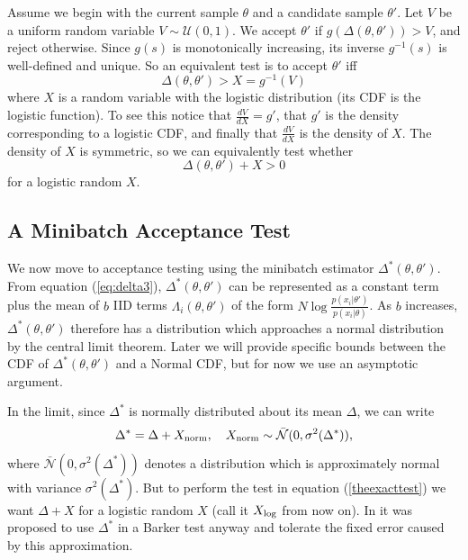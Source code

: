 \documentclass{article}
\begin{document}
Assume we begin with the current sample $\theta$  and a
candidate sample $\theta'$. Let $V$ be a uniform random variable $V \sim
\mathcal{U}(0,1)$. We accept $\theta'$ if $g(\Delta(\theta,\theta')) > V$, and reject otherwise.
Since $g(s)$ is monotonically increasing, its inverse $g^{-1}(s)$ is well-defined and
unique. So an equivalent test is to accept $\theta'$ iff
\begin{equation}
  \Delta(\theta,\theta') > X = g^{-1}(V)
\end{equation}
where $X$ is a random variable with the logistic distribution (its CDF is the logistic function). To
see this notice that $\frac{dV}{dX} = g'$, that $g'$ is the density corresponding to a logistic
CDF, and finally that $\frac{dV}{dX}$ is the density of $X$. The density of $X$ is symmetric,
so we can equivalently test whether
\begin{equation}
  \label{theexacttest}
  \Delta(\theta,\theta') + X > 0
\end{equation}
for a logistic random $X$. 


\subsection{A Minibatch Acceptance Test}\label{ssec:deltas_minibatch}

We now move to acceptance testing using the minibatch estimator
$\Delta^*(\theta,\theta')$. From equation (\ref{eq:delta3}),
$\Delta^*(\theta,\theta')$ can be represented as a constant term
plus the mean of $b$ IID terms $\Lambda_i(\theta,\theta')$ of the form
$N\log\frac{p(x_i|\theta')}{p(x_i|\theta)}$. As $b$ increases, $\Delta^*(\theta,\theta')$
therefore has a distribution which approaches a normal distribution by the central limit
theorem. Later we will provide specific bounds between the CDF of $\Delta^*(\theta,\theta')$
and a Normal CDF, but for now we use an asymptotic argument. 

In the limit, since $\Delta^*$ is normally distributed about its mean $\Delta$, we
can write
\begin{equation}\label{eq:relationship}
\Delta^* = \Delta + X_{\rm norm}, \quad X_{\rm norm} \sim \mathcal{\bar{N}}(0, \sigma^2(\Delta^*)),
\end{equation}
where $\mathcal{\bar{N}}(0, \sigma^2(\Delta^*))$ denotes a distribution which is approximately
normal with variance $\sigma^2(\Delta^*)$. 
But to perform the test in equation (\ref{theexacttest}) we want $\Delta + X$ for
a logistic random $X$ (call it $X_{\rm log}$ from now on). In \cite{Bardenet15} it was proposed to
use $\Delta^*$ in a Barker test anyway and tolerate the fixed error caused by this approximation. 
\end{document}

